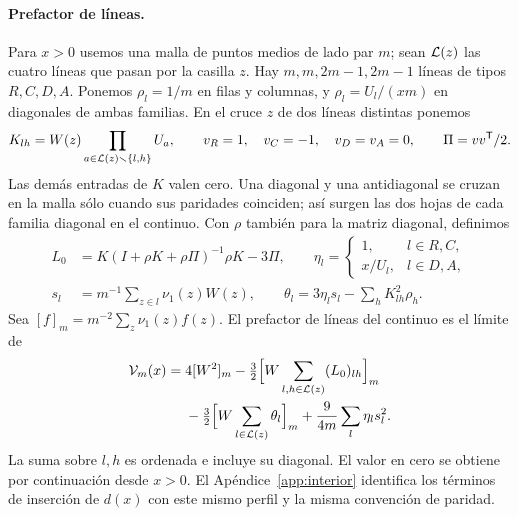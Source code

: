 \paragraph{Prefactor de líneas.}
Para \(x>0\) usemos una malla de puntos medios de lado par \(m\); sean \(\mathcal L(z)\) las cuatro líneas
que pasan por la casilla \(z\). Hay \(m,m,2m-1,2m-1\) líneas de tipos \(R,C,D,A\). Ponemos
\(\rho_l=1/m\) en filas y columnas, y \(\rho_l=U_l/(xm)\) en diagonales de ambas familias.
En el cruce \(z\) de dos líneas distintas ponemos
\[
 K_{lh}=W(z)\prod_{a\in \mathcal L(z)\smallsetminus\{l,h\}}U_a,\qquad
 v_R=1,\quad v_C=-1,\quad v_D=v_A=0,\qquad \Pi=vv^{\mathsf T}/2.
\]
Las demás entradas de \(K\) valen cero. Una diagonal y una antidiagonal se cruzan en la malla
sólo cuando sus paridades coinciden; así surgen las dos hojas de cada familia diagonal en el continuo.
Con \(\rho\) también para la matriz diagonal, definimos
\begin{align*}
 L_0&=K(I+\rho K+\rho\Pi)^{-1}\rho K-3\Pi,\qquad
 \eta_l=\begin{cases}1,&l\in R,C,\\ x/U_l,&l\in D,A,\end{cases}\\
 s_l&=m^{-1}\sum_{z\in l}\nu_1(z)W(z),\qquad
 \theta_l=3\eta_l s_l-\sum_h K_{lh}^2\rho_h .
\end{align*}
Sea \([f]_m=m^{-2}\sum_z\nu_1(z)f(z)\). El prefactor de líneas del continuo es el límite de
\begin{align}
 \mathcal V_m(x)={}&4[W^2]_m
 -\tfrac32\Big[W\sum_{l,h\in \mathcal L(z)}(L_0)_{lh}\Big]_m\notag\\
 &-\tfrac32\Big[W\sum_{l\in \mathcal L(z)}\theta_l\Big]_m
 +\frac{9}{4m}\sum_l\eta_l s_l^2 .\label{eq:V-def}
\end{align}
La suma sobre \(l,h\) es ordenada e incluye su diagonal. El valor en cero se obtiene por
continuación desde \(x>0\). El Apéndice~\ref{app:interior} identifica los términos de
inserción de \(d(x)\) con este mismo perfil y la misma convención de paridad.
